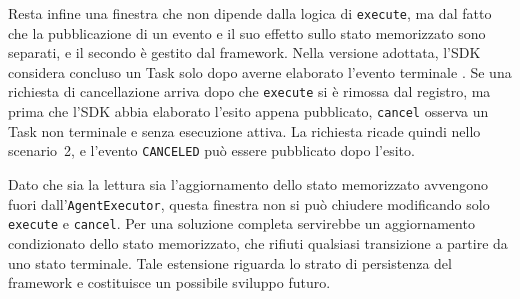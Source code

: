 Resta infine una finestra che non dipende dalla logica di \texttt{execute}, ma dal fatto che la pubblicazione di un evento e il suo effetto sullo stato memorizzato sono separati, e il secondo è gestito dal framework. Nella versione adottata, l'SDK considera concluso un Task solo dopo averne elaborato l'evento terminale \cite{a2apythonsdk}. Se una richiesta di cancellazione arriva dopo che \texttt{execute} si è rimossa dal registro, ma prima che l'SDK abbia elaborato l'esito appena pubblicato, \texttt{cancel} osserva un Task non terminale e senza esecuzione attiva. La richiesta ricade quindi nello scenario~2, e l'evento \texttt{CANCELED} può essere pubblicato dopo l'esito.

Dato che sia la lettura sia l'aggiornamento dello stato memorizzato avvengono fuori dall'\texttt{AgentExecutor}, questa finestra non si può chiudere modificando solo \texttt{execute} e \texttt{cancel}. Per una soluzione completa servirebbe un aggiornamento condizionato dello stato memorizzato, che rifiuti qualsiasi transizione a partire da uno stato terminale. Tale estensione riguarda lo strato di persistenza del framework e costituisce un possibile sviluppo futuro.
